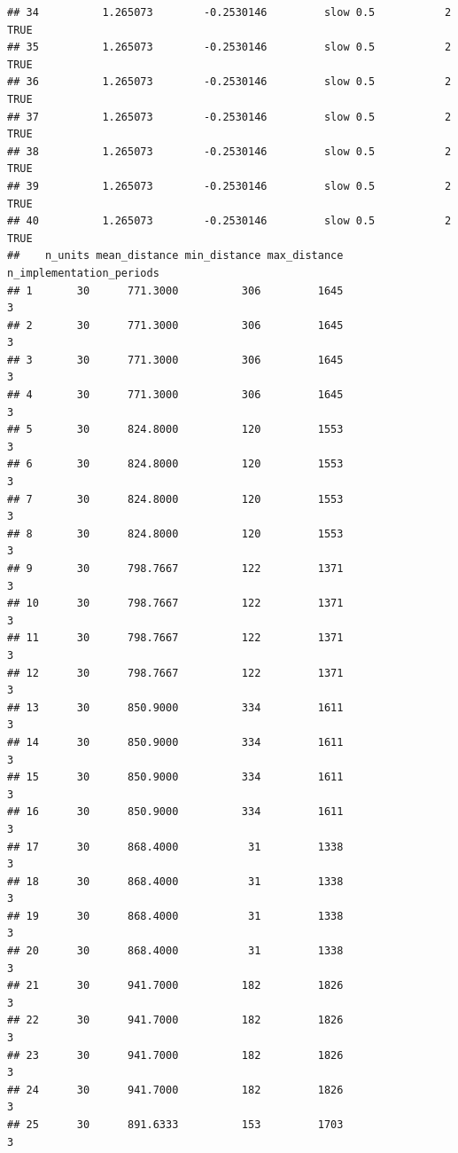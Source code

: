 \documentclass[
]{article}
\begin{document}
\begin{verbatim}
## 34          1.265073        -0.2530146         slow 0.5           2    TRUE
## 35          1.265073        -0.2530146         slow 0.5           2    TRUE
## 36          1.265073        -0.2530146         slow 0.5           2    TRUE
## 37          1.265073        -0.2530146         slow 0.5           2    TRUE
## 38          1.265073        -0.2530146         slow 0.5           2    TRUE
## 39          1.265073        -0.2530146         slow 0.5           2    TRUE
## 40          1.265073        -0.2530146         slow 0.5           2    TRUE
##    n_units mean_distance min_distance max_distance n_implementation_periods
## 1       30      771.3000          306         1645                        3
## 2       30      771.3000          306         1645                        3
## 3       30      771.3000          306         1645                        3
## 4       30      771.3000          306         1645                        3
## 5       30      824.8000          120         1553                        3
## 6       30      824.8000          120         1553                        3
## 7       30      824.8000          120         1553                        3
## 8       30      824.8000          120         1553                        3
## 9       30      798.7667          122         1371                        3
## 10      30      798.7667          122         1371                        3
## 11      30      798.7667          122         1371                        3
## 12      30      798.7667          122         1371                        3
## 13      30      850.9000          334         1611                        3
## 14      30      850.9000          334         1611                        3
## 15      30      850.9000          334         1611                        3
## 16      30      850.9000          334         1611                        3
## 17      30      868.4000           31         1338                        3
## 18      30      868.4000           31         1338                        3
## 19      30      868.4000           31         1338                        3
## 20      30      868.4000           31         1338                        3
## 21      30      941.7000          182         1826                        3
## 22      30      941.7000          182         1826                        3
## 23      30      941.7000          182         1826                        3
## 24      30      941.7000          182         1826                        3
## 25      30      891.6333          153         1703                        3

\end{verbatim}
\end{document}
